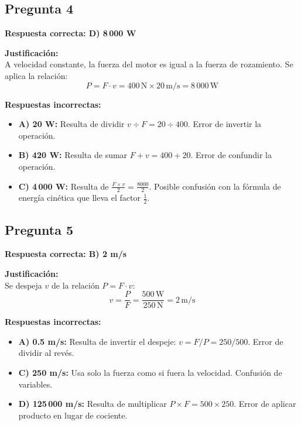\newpage

\begin{respuestabox}
\subsection{Pregunta 4}
\textcolor{verdecorrecto}{\textbf{Respuesta correcta: D) 8\,000 W}}

\textbf{Justificación:}\\
A velocidad constante, la fuerza del motor es igual a la fuerza de rozamiento. Se aplica la relación:
$$P = F \cdot v = 400\,\text{N} \times 20\,\text{m/s} = 8\,000\,\text{W}$$

\textbf{Respuestas incorrectas:}
\begin{itemize}
    \item \textbf{A) 20 W:} Resulta de dividir $v \div F = 20 \div 400$. Error de invertir la operación.
    \item \textbf{B) 420 W:} Resulta de sumar $F + v = 400 + 20$. Error de confundir la operación.
    \item \textbf{C) 4\,000 W:} Resulta de $\frac{F \times v}{2} = \frac{8000}{2}$. Posible confusión con la fórmula de energía cinética que lleva el factor $\frac{1}{2}$.
\end{itemize}
\end{respuestabox}

\begin{respuestabox}
\subsection{Pregunta 5}
\textcolor{verdecorrecto}{\textbf{Respuesta correcta: B) 2 m/s}}

\textbf{Justificación:}\\
Se despeja $v$ de la relación $P = F \cdot v$:
$$v = \frac{P}{F} = \frac{500\,\text{W}}{250\,\text{N}} = 2\,\text{m/s}$$

\textbf{Respuestas incorrectas:}
\begin{itemize}
    \item \textbf{A) 0.5 m/s:} Resulta de invertir el despeje: $v = F/P = 250/500$. Error de dividir al revés.
    \item \textbf{C) 250 m/s:} Usa solo la fuerza como si fuera la velocidad. Confusión de variables.
    \item \textbf{D) 125\,000 m/s:} Resulta de multiplicar $P \times F = 500 \times 250$. Error de aplicar producto en lugar de cociente.
\end{itemize}
\end{respuestabox}

